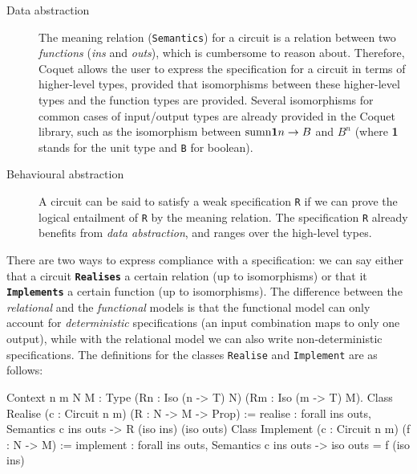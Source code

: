 \documentclass[a4paper]{article}
\begin{document}
                \begin{description}
                    \item[Data abstraction] The meaning relation (\texttt{Semantics}) for a circuit
                        is a relation between two \emph{functions} (\emph{ins} and \emph{outs}),
                        which is cumbersome to reason about. Therefore, Coquet allows the user to
                        express the specification for a circuit in terms of higher-level types,
                        provided that isomorphisms between these higher-level types and the function
                        types are provided. Several isomorphisms for common cases of input/output
                        types are already provided in the Coquet library, such as the isomorphism
                        between $ \text{sumn} \text{\textbf{1}} n \rightarrow B$ and $ B^{n} $
                        (where \textbf{1} stands for the unit type and \texttt{B} for boolean).

                    \item[Behavioural abstraction] A circuit can be said to satisfy a weak
                        specification 
                        \texttt{R} if we can prove the logical entailment of \texttt{R} by the
                        meaning relation. The specification \texttt{R} already benefits from
                        \emph{data abstraction}, and ranges over the high-level types.
                \end{description}

                There are two ways to express compliance with a specification: we can say either
                that a circuit \texttt{\textbf{Realises}} a certain relation (up to isomorphisms) or
                that it \texttt{\textbf{Implements}} a certain function (up to isomorphisms). The
                difference between the \emph{relational} and the \emph{functional} models is that
                the functional model can only account for \emph{deterministic} specifications (an
                input combination maps to only one output), while with the relational model we can
                also write non-deterministic specifications. The definitions for the classes
                \texttt{Realise} and \texttt{Implement} are as follows:

                \begin{coqcode}
        Context {n m N M : Type} (Rn : Iso (n -> T) N) (Rm : Iso (m -> T) M).
        Class Realise (c : Circuit n m) (R : N -> M -> Prop) :=
            realise :
                forall ins outs, Semantics c ins outs -> R (iso ins) (iso outs)
        Class Implement (c : Circuit n m) (f : N -> M) :=
            implement :
                forall ins outs, Semantics c ins outs -> iso outs = f (iso ins)
                    \end{coqcode}
\end{document}
